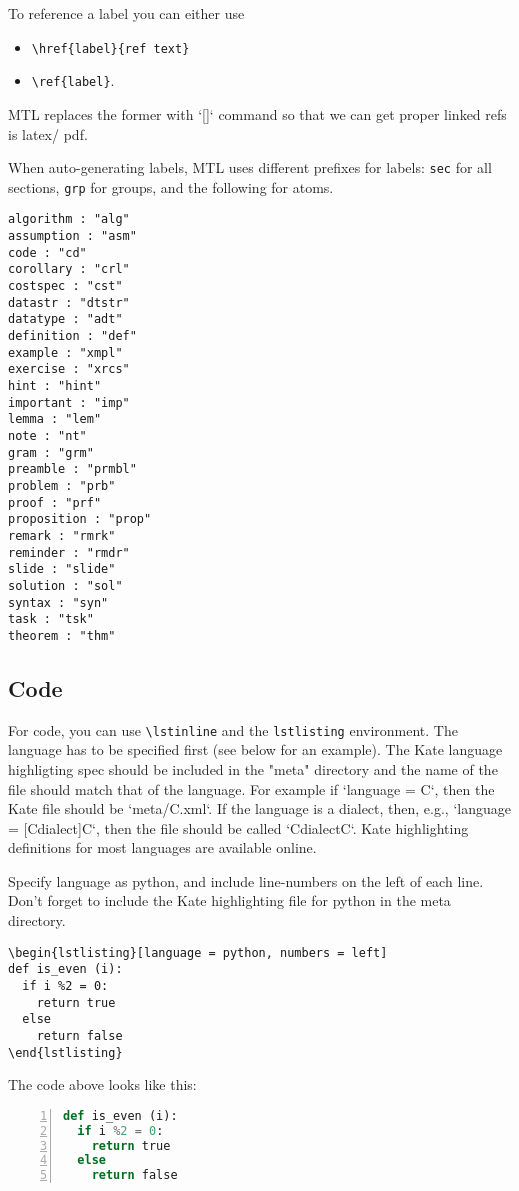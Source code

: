 \begin{gram}[References]
To reference a label you can either use
\begin{itemize}
\item \lstinline`\href{label}{ref text}`
\item \lstinline`\ref{label}`.
\end{itemize}
%
MTL replaces the former with `\hyperref[][]` command so that we can get proper linked refs is latex/ pdf.
\end{gram}


When auto-generating labels, MTL uses different prefixes for labels: \lstinline`sec` for all sections, \lstinline`grp` for groups, and the following for atoms.
%
\begin{lstlisting}
algorithm : "alg"
assumption : "asm"
code : "cd"
corollary : "crl"
costspec : "cst"
datastr : "dtstr"
datatype : "adt"
definition : "def"
example : "xmpl"
exercise : "xrcs"
hint : "hint"
important : "imp"
lemma : "lem"
note : "nt"
gram : "grm"
preamble : "prmbl"
problem : "prb"
proof : "prf"
proposition : "prop"
remark : "rmrk"
reminder : "rmdr"
slide : "slide"
solution : "sol"
syntax : "syn"
task : "tsk"
theorem : "thm"
\end{lstlisting}

\subsection{Code}
\label{sec:mtl::code}
For code, you can use \lstinline`\lstinline` and the \lstinline`lstlisting` environment.  The language has to be specified first (see below for an example).  The Kate language highligting spec should be included in the "meta" directory and the name of the file should match that of the language.  For example if `language = C`, then the Kate file should be `meta/C.xml`.  If the language is a dialect, then, e.g., `language = {[Cdialect]C}`, then the file should be called `CdialectC`.  Kate highlighting definitions for most languages are available online.

\begin{flex}
\begin{example}
Specify language as python, and include  line-numbers on the left of each line.
Don't forget to include the Kate highlighting file for python in the meta directory.

\begin{verbatim}
\begin{lstlisting}[language = python, numbers = left]
def is_even (i):
  if i %2 = 0:
    return true
  else 
    return false
\end{lstlisting}
\end{verbatim}
\end{example}

The code above looks like this:
%
\begin{lstlisting}[language = python, numbers = left]
def is_even (i):
  if i %2 = 0:
    return true
  else 
    return false
\end{lstlisting}
\end{flex}

